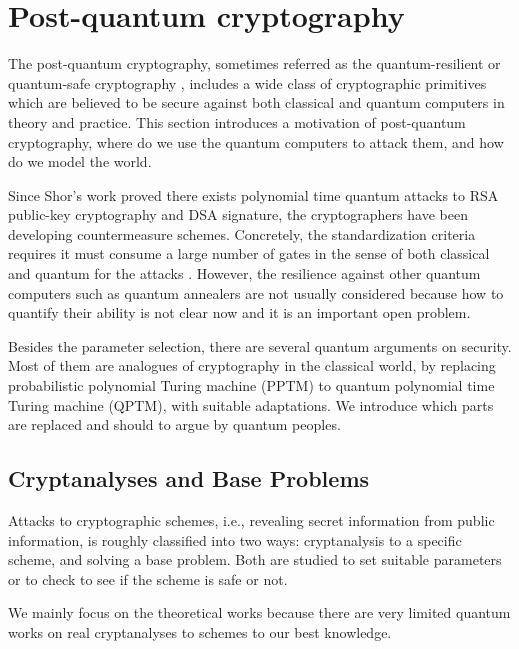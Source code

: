 


\newcommand{\memo}[1]{{\color{red} #1 }}

%



\clearpage

\section{Post-quantum cryptography}

The post-quantum cryptography, sometimes referred as the quantum-resilient or quantum-safe cryptography \cite{NISTpq}, includes a wide class of cryptographic primitives which are believed to be secure against both classical and quantum computers in theory and practice.
This section introduces a motivation of post-quantum cryptography, where do we use the quantum computers to attack them, and how do we model the world.

Since Shor's work \cite{Shor97} proved there exists polynomial time 
quantum attacks to RSA public-key cryptography and DSA signature,
the cryptographers have been developing countermeasure schemes.
Concretely, the standardization criteria requires it must consume a large number 
of gates in the sense of both classical and quantum for the attacks \cite
[p.18]{NISTpq}.
However, the resilience against other quantum computers such as quantum annealers are not usually considered because how to quantify their ability is not clear now and it is an important open problem.

Besides the parameter selection, 
there are several quantum arguments on security.
Most of them are analogues of cryptography in the classical world, by replacing probabilistic polynomial Turing machine (PPTM) to quantum polynomial time Turing machine (QPTM), with suitable adaptations.
We introduce which parts are replaced and should to argue by quantum peoples.

\subsection{Cryptanalyses and Base Problems}

Attacks to cryptographic schemes, i.e., revealing secret information from public information, is roughly classified into two ways: cryptanalysis to a specific scheme, and solving a base problem.
Both are studied to set suitable parameters or to check to see if the scheme is safe or not.

We mainly focus on the theoretical works
because there are very limited quantum works on real cryptanalyses to schemes to our best knowledge.

